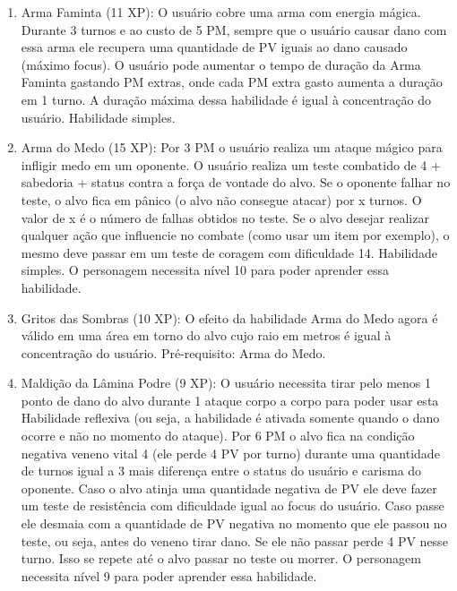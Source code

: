 \begin{enumerate}
    
  
  	\item Arma Faminta (11 XP): O usuário cobre uma arma com energia mágica. Durante 3 turnos e ao custo de 5 PM, sempre que o usuário causar dano com essa arma ele recupera uma quantidade de PV iguais ao dano causado (máximo focus). O usuário pode aumentar o tempo de duração da Arma Faminta gastando PM extras, onde cada PM extra gasto aumenta a duração em 1 turno. A duração máxima dessa habilidade é igual à concentração do usuário. Habilidade simples.
  	
  	\item Arma do Medo (15 XP): Por 3 PM o usuário realiza um ataque mágico para infligir medo em um oponente. O usuário realiza um teste combatido de 4 + sabedoria + status contra a força de vontade do alvo. Se o oponente falhar no teste, o alvo fica em pânico (o alvo não consegue atacar) por x turnos. O valor de x é o número de falhas obtidos no teste. Se o alvo desejar realizar qualquer ação que influencie no combate (como usar um item por exemplo), o mesmo deve passar em um teste de coragem com dificuldade 14. Habilidade simples. O personagem necessita nível 10 para poder aprender essa habilidade.
  	
  	\item Gritos das Sombras (10 XP): O efeito da habilidade Arma do Medo agora é válido em uma área em torno do alvo cujo raio em metros é igual à concentração do usuário. Pré-requisito: Arma do Medo.
  
  	\item Maldição da Lâmina Podre (9 XP): O usuário necessita tirar pelo menos 1 ponto de dano do alvo durante 1 ataque corpo a corpo para poder usar esta Habilidade reflexiva (ou seja, a habilidade é ativada somente quando o dano ocorre e não no momento do ataque). Por 6 PM o alvo fica na condição negativa veneno vital 4 (ele perde 4 PV por turno) durante uma quantidade de turnos igual a 3 mais diferença entre o status do usuário e carisma do oponente. Caso o alvo atinja uma quantidade negativa de PV ele deve fazer um teste de resistência com dificuldade igual ao focus do usuário. Caso passe ele desmaia com a quantidade de PV negativa no momento que ele passou no teste, ou seja, antes do veneno tirar dano. Se ele não passar perde 4 PV nesse turno. Isso se repete até o alvo passar no teste ou morrer. O personagem necessita nível 9 para poder aprender essa habilidade.
    

\end{enumerate}
